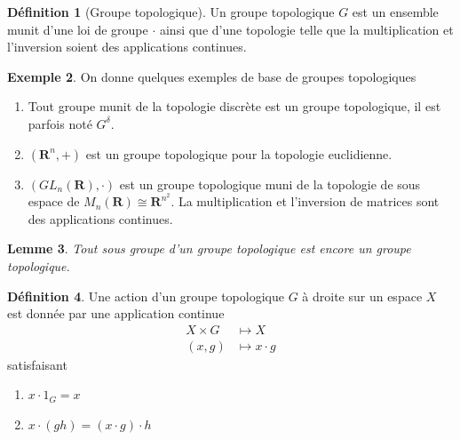 \documentclass[12pt]{book}
\newtheorem{lemma}{Lemme}[section]
\theoremstyle{definition}
\newtheorem{definition}[lemma]{Définition}
\newtheorem{example}[lemma]{Exemple}
\theoremstyle{remark}
\begin{document}
	\begin{definition}[Groupe topologique]
		Un groupe topologique $G$ est un ensemble munit d'une loi de groupe $\cdot$ ainsi que d'une topologie telle que la multiplication et l'inversion soient des applications continues. 
	\end{definition}

	\begin{example} On donne quelques exemples de base de groupes topologiques \\
		\begin{enumerate}
			\item Tout groupe munit de la topologie discrète est un groupe topologique, il est parfois noté $G^{\delta}$.
			\item $(\mathbf{R}^n,+)$ est un groupe topologique pour la topologie euclidienne.
			\item $(GL_n(\mathbf{R}),\cdot)$ est un groupe topologique muni de la topologie de sous espace de $M_n(\mathbf{R}) \cong \mathbf{R}^{n^2}$. La multiplication et l'inversion de matrices sont des applications continues. 
		\end{enumerate}	
	\end{example}

	\begin{lemma}
		Tout sous groupe d'un groupe topologique est encore un groupe topologique.
	\end{lemma}

	\begin{definition}
		Une action d'un groupe topologique $G$ à droite sur un espace $X$ est donnée par une application continue
		\begin{align*}
			X \times G &\longmapsto X \\
			(x,g) &\longmapsto x\cdot g
		\end{align*} satisfaisant 

		\begin{enumerate}
			\item $x \cdot 1_G = x$
			\item $x \cdot (gh) = (x \cdot g)\cdot h$
		\end{enumerate}
	\end{definition}
\end{document}
